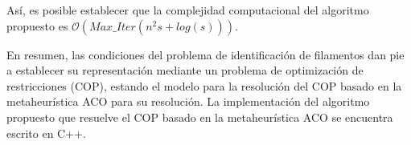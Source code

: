 As\'i, es posible establecer que la complejidad computacional del algoritmo propuesto es $\mathcal{O}{(Max\_Iter (n^{2}s + log(s)))}$.

\vspace{1.5cm}
En resumen, las condiciones del problema de identificaci\'on de filamentos dan pie a establecer su representaci\'on mediante un problema de optimizaci\'on de restricciones (COP), estando el modelo para la resoluci\'on del COP basado en la metaheur\'istica ACO para su resoluci\'on. La implementaci\'on del algoritmo propuesto que resuelve el COP basado en la metaheur\'istica ACO se encuentra escrito en C++.